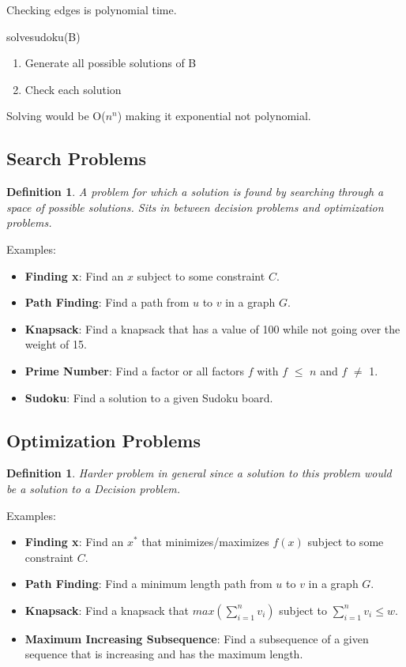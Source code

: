 \documentclass[twoside]{article}
\newtheorem{definition}[theorem]{Definition}
\begin{document}
Checking edges is polynomial time.

\begin{algorithm}[H]
\caption*{{\sc solvesudoku(B)}}
\begin{enumerate}
    \item Generate all possible solutions of B
    \item Check each solution
\end{enumerate}
\end{algorithm} 

Solving would be O($n^n$) making it exponential not polynomial.

\subsection{Search Problems}

\begin{definition}
A problem for which a solution is found by searching through a space of possible solutions. Sits 
in between decision problems and optimization problems.
\end{definition}

Examples:
\begin{itemize}
    \item \textbf{Finding x}: Find an $x$ subject to some constraint $C$.
    \item \textbf{Path Finding}: Find a path from $u$ to $v$ in a graph $G$.
    \item \textbf{Knapsack}: Find a knapsack that has a value of 100 while not going over the weight of 15.
    \item \textbf{Prime Number}: Find a factor or all factors $f$ with $f$ $\leq$ $n$ and $f$ $\neq$ 1.
    \item \textbf{Sudoku}: Find a solution to a given Sudoku board.
\end{itemize}

\subsection{Optimization Problems}

\begin{definition}
    Harder problem in general since a solution to this problem would be a solution to a {\em Decision} problem.
\end{definition}

Examples:
\begin{itemize}
    \item \textbf{Finding x}: Find an $x^*$ that minimizes/maximizes $f(x)$ subject to some constraint $C$.
    \item \textbf{Path Finding}: Find a minimum length path from $u$ to $v$ in a graph $G$.
    \item \textbf{Knapsack}: Find a knapsack that $max(\sum_{i=1}^{n}v_i)$ subject to $\sum_{i=1}^{n}v_i \leq w$.
    \item \textbf{Maximum Increasing Subsequence}: Find a subsequence of a given sequence that is increasing and has the 
    maximum length.
\end{itemize}
\end{document}
